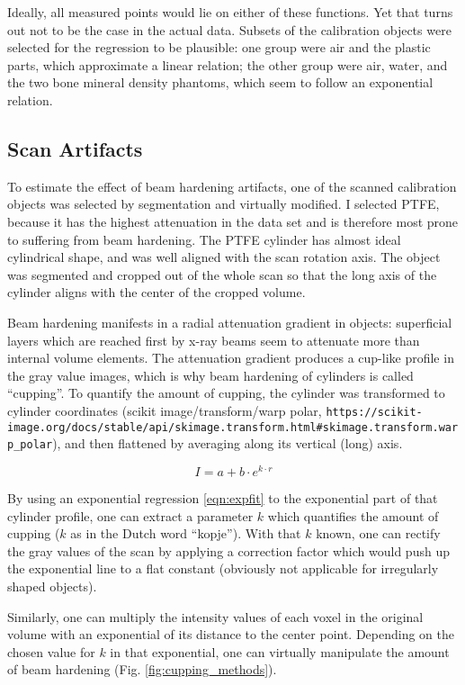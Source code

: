 Ideally, all measured points would lie on either of these functions.
Yet that turns out not to be the case in the actual data.
Subsets of the calibration objects were selected for the regression to be plausible: one group were air and the plastic parts, which approximate a linear relation; the other group were air, water, and the two bone mineral density phantoms, which seem to follow an exponential relation.


\subsection{Scan Artifacts}
\label{sec:org52dbaff}
To estimate the effect of beam hardening artifacts, one of the scanned calibration objects was selected by segmentation and virtually modified.
I selected PTFE, because it has the highest attenuation in the data set and is therefore most prone to suffering from beam hardening.
The PTFE cylinder has almost ideal cylindrical shape, and was well aligned with the scan rotation axis.
The object was segmented and cropped out of the whole scan so that the long axis of the cylinder aligns with the center of the cropped volume.


Beam hardening manifests in a radial attenuation gradient in objects: superficial layers which are reached first by x-ray beams seem to attenuate more than internal volume elements.
The attenuation gradient produces a cup-like profile in the gray value images, which is why beam hardening of cylinders is called ``cupping''.
To quantify the amount of cupping, the cylinder was transformed to cylinder coordinates (scikit image/transform/warp polar, \nolinkurl{https://scikit-image.org/docs/stable/api/skimage.transform.html#skimage.transform.warp_polar}), and then flattened by averaging along its vertical (long) axis.

\begin{equation}\label{eqn:expfit}
 I = a+b\cdot e^{k\cdot r}
\end{equation}

By using an exponential regression \eqref{eqn:expfit} to the exponential part of that cylinder profile, one can extract a parameter \(k\) which quantifies the amount of cupping (\(k\) as in the Dutch word ``kopje'').
With that \(k\) known, one can rectify the gray values of the scan by applying a correction factor which would push up the exponential line to a flat constant (obviously not applicable for irregularly shaped objects).

Similarly, one can multiply the intensity values of each voxel in the original volume with an exponential of its distance to the center point.
Depending on the chosen value for \(k\) in that exponential, one can virtually manipulate the amount of beam hardening (Fig. \ref{fig:cupping_methods}).


